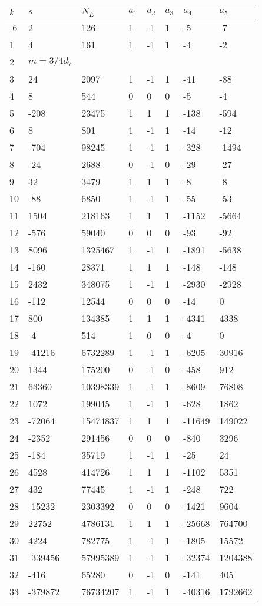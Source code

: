\documentclass{amsart}
\begin{document}
\begin{longtable}{|l|l|l|lllll|}
\hline
$k$ & $s$ & $N_E$ & $a_1$ & $a_2$ & $a_3$ & $a_4$ & $a_5$\\
\hline
-6&2&126&1&-1&1&-5&-7\\
1&4&161&1&-1&1&-4&-2\\
2&$m=3/4d_{7}$&&\multicolumn{5}{c|}{}\\
3&24&2097&1&-1&1&-41&-88\\
4&8&544&0&0&0&-5&-4\\
5&-208&23475&1&1&1&-138&-594\\
6&8&801&1&-1&1&-14&-12\\
7&-704&98245&1&-1&1&-328&-1494\\
8&-24&2688&0&-1&0&-29&-27\\
9&32&3479&1&1&1&-8&-8\\
10&-88&6850&1&-1&1&-55&-53\\
11&1504&218163&1&1&1&-1152&-5664\\
12&-576&59040&0&0&0&-93&-92\\
13&8096&1325467&1&-1&1&-1891&-5638\\
14&-160&28371&1&1&1&-148&-148\\
15&2432&348075&1&-1&1&-2930&-2928\\
16&-112&12544&0&0&0&-14&0\\
17&800&134385&1&1&1&-4341&4338\\
18&-4&514&1&0&0&-4&0\\
19&-41216&6732289&1&-1&1&-6205&30916\\
20&1344&175200&0&-1&0&-458&912\\
21&63360&10398339&1&-1&1&-8609&76808\\
22&1072&199045&1&-1&1&-628&1862\\
23&-72064&15474837&1&1&1&-11649&149022\\
24&-2352&291456&0&0&0&-840&3296\\
25&-184&35719&1&-1&1&-25&24\\
26&4528&414726&1&1&1&-1102&5351\\
27&432&77445&1&-1&1&-248&722\\
28&-15232&2303392&0&0&0&-1421&9604\\
29&22752&4786131&1&1&1&-25668&764700\\
30&4224&782775&1&-1&1&-1805&15572\\
31&-339456&57995389&1&-1&1&-32374&1204388\\
32&-416&65280&0&-1&0&-141&405\\
33&-379872&76734207&1&-1&1&-40316&1792662\\

\end{longtable}
\end{document}
